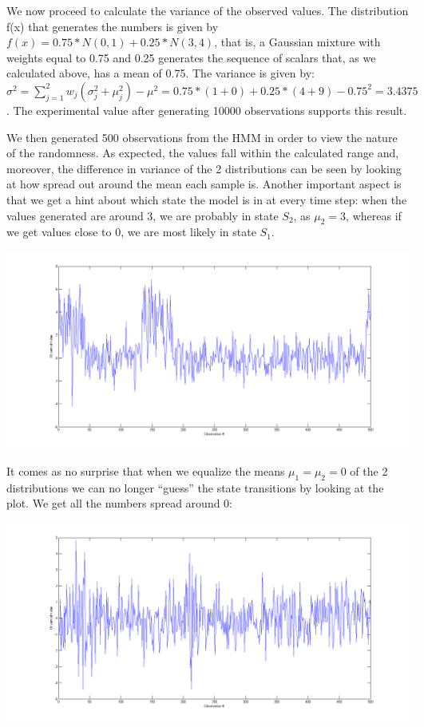 \documentclass[a4paper, 10pt]{article}
\begin{document}
We now proceed to calculate the variance of the observed values. The distribution f(x) that generates the numbers is given by $f(x)=0.75*N(0,1) + 0.25*N(3,4)$, that is, a Gaussian mixture with weights equal to 0.75 and 0.25 generates the sequence of scalars that, as we calculated above, has a mean of 0.75. The variance is given by: $\sigma^2=\sum\limits_{j=1}^{2}w_j(\sigma_j^2+\mu_j^2)-\mu^2 = 0.75*(1+0)+0.25*(4+9)-0.75^2=3.4375$. The experimental value after generating 10000 observations supports this result.

We then generated 500 observations from the HMM in order to view the nature of the randomness. As expected, the values fall within the calculated range and, moreover, the difference in variance of the 2 distributions can be seen by looking at how spread out around the mean each sample is. Another important aspect is that we get a hint about which state the model is in at every time step: when the values generated are around 3, we are probably in state $S_2$, as $\mu_2=3$, whereas if we get values close to 0, we are most likely in state $S_1$.
\begin{center}
\includegraphics[scale=0.33]{500.png}
\end{center}

It comes as no surprise that when we equalize the means $\mu_1=\mu_2=0$ of the 2 distributions we can no longer ``guess'' the state transitions by looking at the plot. We get all the numbers spread around 0:
\begin{center}
\includegraphics[scale=0.4]{500b.png}
\end{center}
\end{document}
